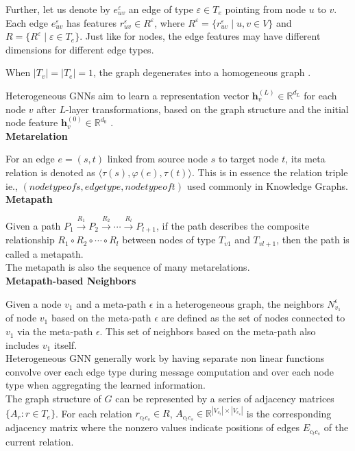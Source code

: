 \documentclass{report} %
\begin{document}
Further, let us denote by \( e_{uv}^{\varepsilon} \) an edge of type \( \varepsilon \in T_e \) pointing from node \( u \) to \( v \). 
Each edge \( e_{uv}^{\varepsilon} \) has features \( r_{uv}^{\varepsilon} \in R^{\varepsilon} \), 
where \( R^{\varepsilon} = \{ r_{uv}^{\varepsilon} \mid u, v \in V \} \) and \( R = \{ R^{\varepsilon} \mid \varepsilon \in T_e \} \). 
Just like for nodes, the edge features may have different dimensions for different edge types.

When \( |T_v| = |T_e| = 1 \), the graph degenerates into a homogeneous graph \cite{SE HGNN-2023}.

Heterogeneous \ac{GNN}s aim to learn a representation vector \( \mathbf{h}^{(L)}_v \in \mathbb{R}^{d_L} \) for each node \( v \) after \( L \)-layer transformations, 
based on the graph structure and the initial node feature \( \mathbf{h}^{(0)}_v \in \mathbb{R}^{d_0} \) \cite{REF HGNN-2021}.\\

\textbf{Metarelation}

For an edge \( e = (s, t) \) linked from source node \( s \) to target node \( t \), its meta relation is denoted as
\(
\langle \tau(s), \varphi(e), \tau(t) \rangle.
\)
This is in essence the relation triple ie., 
\(  (node type of s, edge type, node type of t) \) used commonly in Knowledge Graphs.\\

\textbf{Metapath}

Given a path
\(
P_1 \xrightarrow{R_1} P_2 \xrightarrow{R_2} \cdots \xrightarrow{R_l} P_{l+1}
\), 
if the path describes the composite relationship \( R_1 \circ R_2 \circ \cdots \circ R_l \)  
between nodes of type \( T_{v1} \) and \( T_{vl+1} \), then the path is called a metapath. \\
The metapath is also the sequence of many metarelations.\\

\textbf{Metapath-based Neighbors}

Given a node \( v_1 \) and a meta-path \( \epsilon \) in a heterogeneous graph, the neighbors \( N_{v_1}^{\epsilon} \) of 
node \( v_1 \) based on the meta-path \( \epsilon \) are defined as the set of nodes connected to \( v_1 \) via the meta-path \( \epsilon \). 
This set of neighbors based on the meta-path also includes \( v_1 \) itself.\\

Heterogeneous \ac{GNN} generally work by having separate non linear functions convolve over each edge type during message computation and over each node type when aggregating the learned information. \\
The graph structure of \( G \) can be represented by a series of adjacency matrices \(\{A_r : r \in T_e\}\). 
For each relation \(r_{c_t c_s} \in R\), \(A_{c_t c_s} \in \mathbb{R}^{|V_{c_t}| \times |V_{c_s}|}\) is the corresponding 
adjacency matrix where the nonzero values indicate positions of edges \(E_{c_t c_s}\) of the current relation.\\
\end{document}
